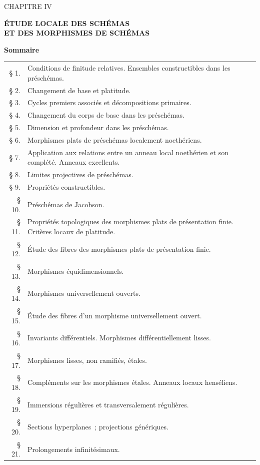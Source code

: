 \cleardoublepage
{}
\thispagestyle{plain}

\begin{center}
{\Large CHAPITRE IV}

\vspace{1.5cm}
{\LARGE\bfseries ÉTUDE LOCALE DES SCHÉMAS\\[0.3em]
ET DES MORPHISMES DE SCHÉMAS}

\vspace{1.5cm}
{\large\bfseries Sommaire}
\end{center}

\medskip
\begin{tabular}{@{}r p{}}
§ 1. & Conditions de finitude relatives. Ensembles constructibles dans les préschémas.\\
§ 2. & Changement de base et platitude.\\
§ 3. & Cycles premiers associés et décompositions primaires.\\
§ 4. & Changement du corps de base dans les préschémas.\\
§ 5. & Dimension et profondeur dans les préschémas.\\
§ 6. & Morphismes plats de préschémas localement noethériens.\\
§ 7. & Application aux relations entre un anneau local noethérien et son complété.
Anneaux excellents.\\
§ 8. & Limites projectives de préschémas.\\
§ 9. & Propriétés constructibles.\\
§ 10. & Préschémas de Jacobson.\\
§ 11.\footnotemark[1] & Propriétés topologiques des morphismes plats de présentation finie.
Critères locaux de platitude.\\
§ 12. & Étude des fibres des morphismes plats de présentation finie.\\
§ 13. & Morphismes équidimensionnels.\\
§ 14. & Morphismes universellement ouverts.\\
§ 15. & Étude des fibres d'un morphisme universellement ouvert.\\
§ 16. & Invariants différentiels. Morphismes différentiellement lisses.\\
§ 17. & Morphismes lisses, non ramifiés, étales.\\
§ 18. & Compléments sur les morphismes étales. Anneaux locaux henséliens.\\
§ 19. & Immersions régulières et transversalement régulières.\\
§ 20. & Sections hyperplanes~; projections génériques.\\
§ 21. & Prolongements infinitésimaux.\\
\end{tabular}

